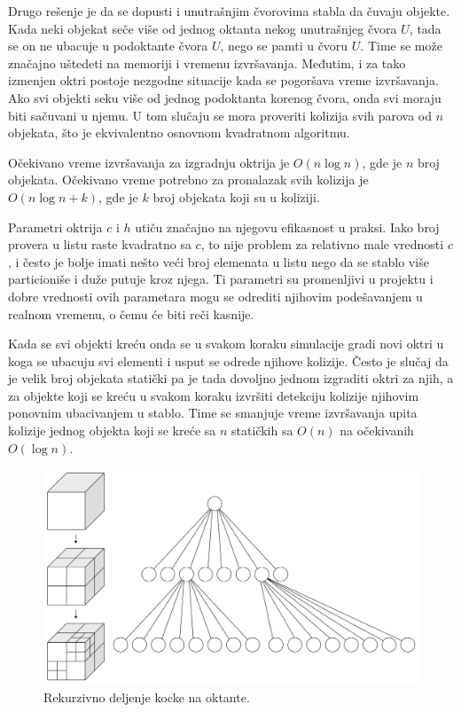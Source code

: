 \documentclass[12pt,oneside]{memoir}
\begin{document}
Drugo rešenje je da se dopusti i unutrašnjim čvorovima stabla da čuvaju objekte.
Kada neki objekat seče više od jednog oktanta nekog unutrašnjeg čvora $U$, tada se on ne ubacuje 
u podoktante čvora $U$, nego se pamti u čvoru $U$. Time se može značajno uštedeti na memoriji i vremenu izvršavanja.
Međutim, i za tako izmenjen oktri postoje nezgodne situacije kada se pogoršava vreme izvršavanja.
Ako svi objekti seku više od jednog podoktanta korenog čvora, onda svi moraju biti sačuvani u njemu. 
U tom slučaju se mora proveriti kolizija svih parova od $n$ objekata, što je ekvivalentno osnovnom kvadratnom algoritmu.

Očekivano vreme izvršavanja za izgradnju oktrija je $O(n \log n)$, gde je $n$ broj objekata.
Očekivano vreme potrebno za pronalazak svih kolizija je $O(n \log n + k)$, gde je $k$ broj objekata koji su u koliziji.

Parametri oktrija $c$ i $h$  utiču značajno na njegovu efikasnost u praksi. 
Iako broj provera u listu raste kvadratno sa $c$, to nije problem za relativno male vrednosti $c$, i često je bolje 
imati nešto veći broj elemenata u listu nego da se stablo više particioniše i duže putuje kroz njega.
Ti parametri su promenljivi u projektu i dobre vrednosti ovih parametara mogu se odrediti njihovim podešavanjem u realnom vremenu,
o čemu će biti reči kasnije.

Kada se svi objekti kreću onda se u svakom koraku simulacije  gradi novi oktri u
koga se ubacuju svi elementi i usput se odrede njihove kolizije.
Često je slučaj da je velik broj objekata statički pa je tada dovoljno jednom izgraditi oktri za njih, a za objekte koji se kreću u svakom koraku 
izvršiti detekciju kolizije njihovim ponovnim ubacivanjem u stablo. Time se smanjuje vreme izvršavanja upita 
kolizije jednog objekta koji se kreće sa $n$ statičkih sa $O(n)$ na očekivanih $O(\log n)$.

\begin{figure}[h!]
	\begin{center}
	\includegraphics[scale=0.22]{octree.png}
	\end{center}
	\caption{Rekurzivno deljenje kocke na oktante.}
	\label{fig:oct}
\end{figure}
\end{document}
